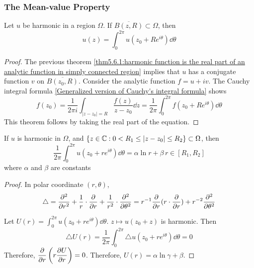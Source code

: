 \subsubsection{The Mean-value Property}

\begin{theorem}\label{thm:5.6.2:mean-value property}
    Let  $ u  $ be harmonic in a region  $ \Omega  $. If  $ \overline{B(z,R)}\subset \Omega $, then 
    \begin{equation}
        u(z)=\int_0^{2\pi }u(z_0+Re^{i\theta})\dd \theta\label{eq:5.6.2:mean-value property}
    \end{equation} 
\end{theorem}
\begin{proof}
    The previous theorem \ref{thm5.6.1:harmonic function is the real part of an analytic function in simply connected region} implies that  $ u  $ has a conjugate function  $ v  $ on  $ \overline{B(z_0,R)} $. Consider the analytic function  $ f=u+iv $. The Cauchy integral formula \ref{Generalized version of Cauchy's integral formula}  shows 
    \begin{equation}
        f(z_0)=\frac{1}{2\pi i}\int_{|z-z_0|=R}\frac{f(z)}{z-z_0}\dd z=\frac{1 }{2\pi }\int_0^{2\pi }f(z_0+Re^{i\theta})\dd \theta
    \end{equation}
    This theorem follows by taking the real part of the equation.
\end{proof}
\begin{theorem}
    If  $ u  $ is harmonic in  $ \Omega $, and  $ \{z\in\mathbb C:0<R_1 \leq |z-z_0| \leq R_2\}\subset \Omega $, then 
    \begin{equation}
        \frac{1 }{2\pi }\int_0^{2\pi }u(z_0+re^{i\theta})\dd\theta=\alpha\ln r+\beta\,r\in [R_1,R_2]
    \end{equation}  
    where  $ \alpha $ and  $ \beta $ are constants  
\end{theorem}
\begin{proof}
    In polar coordinate  $ (r,\theta) $,  \[ \displaystyle\triangle=\frac{\partial^2 }{\partial r^2}+\frac{1}{r}\cdot\frac{\partial }{\partial r} +\frac{1}{r^2}\cdot\frac{\partial^2 }{\partial \theta^2}=r^{-1}\frac{\partial }{\partial r}(r\cdot\frac{\partial }{\partial r})+r^{-2}\frac{\partial ^2}{\partial \theta^2}\]

    Let  $ U(r)=\int_0^{2\pi }u(z_0+re^{i\theta})\dd\theta $.  $ z\mapsto u(z_0+z) $ is harmonic. Then 
    \begin{equation}
        \triangle U(r)=\frac{1}{2\pi }\int_0^{2\pi }\triangle u(z_0+re^{i\theta})\dd \theta=0
    \end{equation} 
    Therefore,  $ \displaystyle\frac{\partial }{\partial r}\left(r\frac{\partial U}{\partial r}\right)=0 $. Therefore,
     $ U(r)=\alpha\ln \gamma+\beta $.  
\end{proof}
